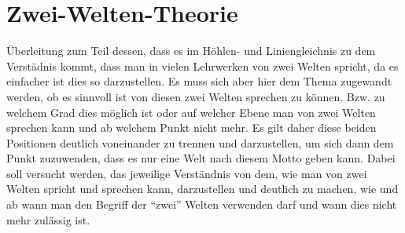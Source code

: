 \documentclass[12pt]{article}
\begin{document}
\section{Zwei-Welten-Theorie}
Überleitung zum Teil dessen, dass es im Höhlen- und Liniengleichnis zu dem Verstädnis kommt, dass man in vielen Lehrwerken von zwei Welten spricht, da es einfacher ist dies so darzustellen. Es muss sich aber hier dem Thema zugewandt werden, ob es sinnvoll ist von diesen zwei Welten sprechen zu können. Bzw. zu welchem Grad dies möglich ist oder auf welcher Ebene man von zwei Welten sprechen kann und ab welchem Punkt nicht mehr. Es gilt daher diese beiden Positionen deutlich voneinander zu trennen und darzustellen, um sich dann dem Punkt zuzuwenden, dass es nur eine Welt nach diesem Motto geben kann. Dabei soll versucht werden, das jeweilige Verständnis von dem, wie man von zwei Welten spricht und sprechen kann, darzustellen und deutlich zu machen, wie und ab wann man den Begriff der \enquote{zwei} Welten verwenden darf und wann dies nicht mehr zulässig ist.
\end{document}
